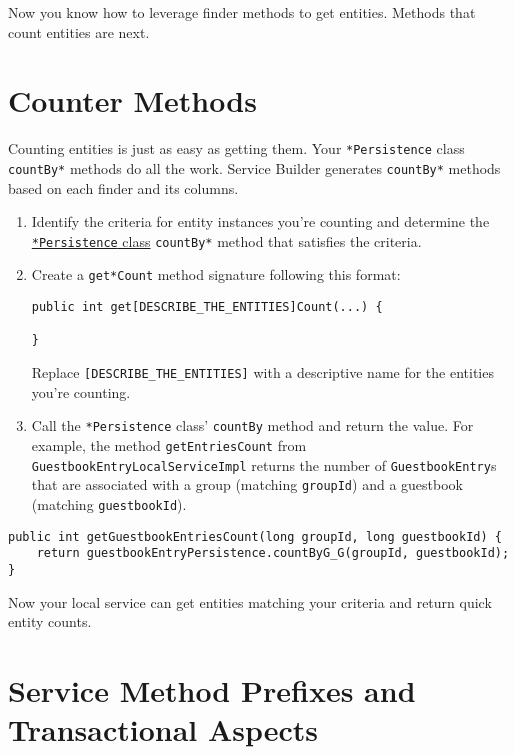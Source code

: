 Now you know how to leverage finder methods to get entities. Methods
that count entities are next.

\section{Counter Methods}\label{counter-methods}

Counting entities is just as easy as getting them. Your
\texttt{*Persistence} class \texttt{countBy*} methods do all the work.
Service Builder generates \texttt{countBy*} methods based on each finder
and its columns.

\begin{enumerate}
\def\labelenumi{\arabic{enumi}.}
\item
  Identify the criteria for entity instances you're counting and
  determine the
  \href{/docs/7-2/appdev/-/knowledge_base/a/understanding-the-code-generated-by-service-builder}{\texttt{*Persistence}
  class} \texttt{countBy*} method that satisfies the criteria.
\item
  Create a \texttt{get*Count} method signature following this format:

\begin{verbatim}
public int get[DESCRIBE_THE_ENTITIES]Count(...) {

}
\end{verbatim}

  Replace \texttt{{[}DESCRIBE\_THE\_ENTITIES{]}} with a descriptive name
  for the entities you're counting.
\item
  Call the \texttt{*Persistence} class' \texttt{countBy} method and
  return the value. For example, the method \texttt{getEntriesCount}
  from \texttt{GuestbookEntryLocalServiceImpl} returns the number of
  \texttt{GuestbookEntry}s that are associated with a group (matching
  \texttt{groupId}) and a guestbook (matching \texttt{guestbookId}).
\end{enumerate}

\begin{verbatim}
public int getGuestbookEntriesCount(long groupId, long guestbookId) {
    return guestbookEntryPersistence.countByG_G(groupId, guestbookId);
}
\end{verbatim}

Now your local service can get entities matching your criteria and
return quick entity counts.

\section{Service Method Prefixes and Transactional
Aspects}\label{service-method-prefixes-and-transactional-aspects}

